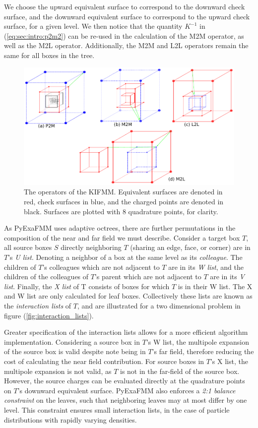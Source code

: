 \documentclass{IEEEcsmag}
\begin{document}
We choose the upward equivalent surface to correspond to the downward check surface, and the downward equivalent surface to correspond to the upward check surface, for a given level. We then notice that the quantity $K^{-1}$ in (\ref{eq:sec:intro:p2m2}) can be re-used in the calculation of the M2M operator, as well as the M2L operator. Additionally, the M2M and L2L operators remain the same for all boxes in the tree.

\begin{figure}
	\centerline{\includegraphics {figures/operators.pdf}}
	\caption{The operators of the KIFMM. Equivalent surfaces are denoted in red, check surfaces in blue, and the charged points are denoted in black. Surfaces are plotted with 8 quadrature points, for clarity.}
	\label{fig:operators}
\end{figure}

As PyExaFMM uses adaptive octrees, there are further permutations in the composition of the near and far field we must describe. Consider a target box $T$, all source boxes $S$ directly neighboring $T$ (sharing an edge, face, or corner) are in $T$'s \textit{U list}. Denoting a neighbor of a box at the same level as its \textit{colleague}. The children of $T$'s colleagues which are not adjacent to $T$ are in its \textit{W list}, and the children of the colleagues of $T$'s parent which are not adjacent to $T$ are in its \textit{V list}. Finally, the \textit{X list} of T consists of boxes for which $T$ is in their W list. The X and W list are only calculated for leaf boxes. Collectively these lists are known as the \textit{interaction lists} of $T$, and are illustrated for a two dimensional problem in figure (\ref{fig:interaction_lists}).

Greater specification of the interaction lists allows for a more efficient algorithm implementation. Considering a source box in $T$'s W list, the multipole expansion of the source box is valid despite note being in $T$'s far field, therefore reducing the cost of calculating the near field contribution. For source boxes in $T$'s X list, the multipole expansion is not valid, as $T$ is not in the far-field of the source box. However, the source charges can be evaluated directly at the quadrature points on $T$'s downward equivalent surface. PyExaFMM also enforces a \textit{2:1 balance constraint} on the leaves, such that neighboring leaves may at most differ by one level. This constraint ensures small interaction lists, in the case of particle distributions with rapidly varying densities.
\end{document}
